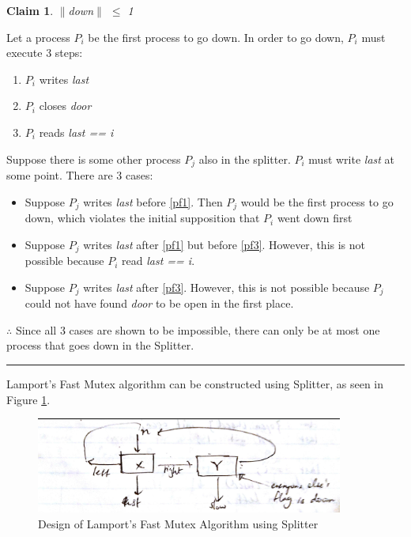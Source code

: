 \documentclass[twoside]{article}
\newtheorem{claim}[theorem]{Claim}
\newenvironment{proof}{{\bf Proof:}}{\hfill\rule{2mm}{2mm}}
\begin{document}
\begin{claim}
$\|$down$\|$ $\le$ 1
\end{claim}
\begin{proof}
Let a process ${P_i}$ be the first process to go down. In order to go down, ${P_i}$ must execute 3 steps:
\begin{enumerate}
\item ${P_i}$ writes \textit{last} \label{pf1}
\item ${P_i}$ closes \textit{door} \label{pf2}
\item ${P_i}$ reads \textit{last == i} \label{pf3}
\end{enumerate}
Suppose there is some other process ${P_j}$ also in the splitter. ${P_i}$ must write \textit{last} at some point. There are 3 cases:

\begin{itemize}

\item Suppose ${P_j}$ writes \textit{last} before \ref{pf1}. Then ${P_j}$ would be the first process to go down, which violates the initial supposition that ${P_i}$ went down first 


\item Suppose ${P_j}$ writes \textit{last} after \ref{pf1} but before \ref{pf3}. However, this is not possible because ${P_i}$ read \textit{last == i}.


\item Suppose ${P_j}$ writes \textit{last} after \ref{pf3}. However, this is not possible because ${P_j}$ could not have found \textit{door} to be open in the first place.
    
\end{itemize}
$\therefore$ Since all 3 cases are shown to be impossible, there can only be at most one process that goes down in the Splitter.
\end{proof}

Lamport's Fast Mutex algorithm can be constructed using Splitter, as seen in Figure \ref{fig:lamportfast}.

\begin{figure}
\centering
\includegraphics[width=0.9\textwidth]{lamportfast.png}
\caption{\label{fig:lamportfast}Design of Lamport's Fast Mutex Algorithm using Splitter}
\end{figure}
\end{document}
